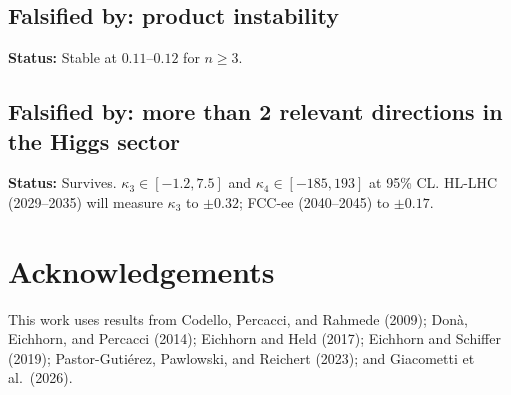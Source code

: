 \documentclass[12pt]{article}
\begin{document}
\subsection{Falsified by: product instability}

\textbf{Status:} Stable at $0.11$--$0.12$ for $n\ge3$.

\subsection{Falsified by: more than 2 relevant directions in the Higgs sector}

\textbf{Status:} Survives. $\kappa_3\in[-1.2,7.5]$ and $\kappa_4\in[-185,193]$ at 95\% CL. HL-LHC (2029--2035) will measure $\kappa_3$ to $\pm0.32$; FCC-ee (2040--2045) to $\pm0.17$.

\section*{Acknowledgements}

This work uses results from Codello, Percacci, and Rahmede (2009); Don\`{a}, Eichhorn, and Percacci (2014); Eichhorn and Held (2017); Eichhorn and Schiffer (2019); Pastor-Guti\'{e}rez, Pawlowski, and Reichert (2023); and Giacometti et al.\ (2026).
\end{document}
